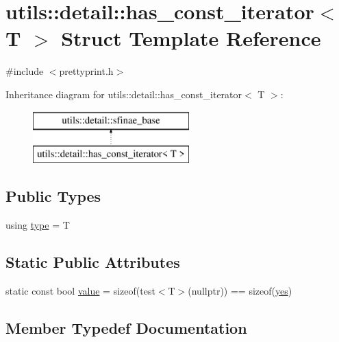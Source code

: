 \hypertarget{structutils_1_1detail_1_1has__const__iterator}{}\section{utils\+::detail\+::has\+\_\+const\+\_\+iterator$<$ T $>$ Struct Template Reference}
\label{structutils_1_1detail_1_1has__const__iterator}


{\ttfamily \#include $<$prettyprint.\+h$>$}

Inheritance diagram for utils\+::detail\+::has\+\_\+const\+\_\+iterator$<$ T $>$\+:\begin{figure}[H]
\begin{center}
\leavevmode
\includegraphics[height=2.000000cm]{d2/d1a/structutils_1_1detail_1_1has__const__iterator}
\end{center}
\end{figure}
\subsection*{Public Types}
\begin{DoxyCompactItemize}
\item 
using \mbox{\hyperlink{structutils_1_1detail_1_1has__const__iterator_ab04a52bc09ea50fb7c36012650b6b898}{type}} = T
\end{DoxyCompactItemize}
\subsection*{Static Public Attributes}
\begin{DoxyCompactItemize}
\item 
static const bool \mbox{\hyperlink{structutils_1_1detail_1_1has__const__iterator_aae38c1a33d1fe863e1e34a0c5054bc69}{value}} = sizeof(test$<$T$>$(nullptr)) == sizeof(\mbox{\hyperlink{structutils_1_1detail_1_1sfinae__base_ad5567f856d8b9af7d1af85c2555ce0e5}{yes}})
\end{DoxyCompactItemize}


\subsection{Member Typedef Documentation}
\mbox{\label{structutils_1_1detail_1_1has__const__iterator_ab04a52bc09ea50fb7c36012650b6b898}} 

